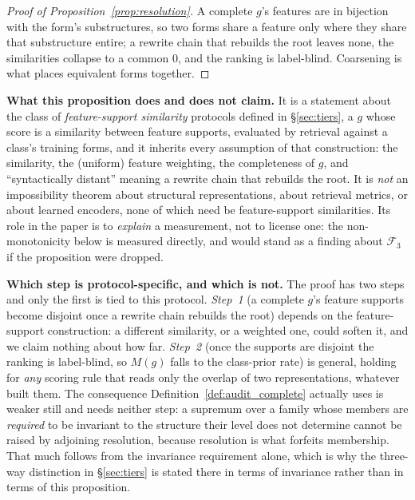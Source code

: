 \begin{proof}[Proof of Proposition~\ref{prop:resolution}]
A complete $g$'s features are in bijection with the form's substructures, so two forms share a feature only where they share that substructure entire; a rewrite chain that rebuilds the root leaves none, the similarities collapse to a common $0$, and the ranking is label-blind. Coarsening is what places equivalent forms together.
\end{proof}

\noindent \textbf{What this proposition does and does not claim.} It is a statement about the class of \emph{feature-support similarity} protocols defined in \S\ref{sec:tiers}, a $g$ whose score is a similarity between feature supports, evaluated by retrieval against a class's training forms, and it inherits every assumption of that construction: the similarity, the (uniform) feature weighting, the completeness of $g$, and ``syntactically distant'' meaning a rewrite chain that rebuilds the root. It is \emph{not} an impossibility theorem about structural representations, about retrieval metrics, or about learned encoders, none of which need be feature-support similarities. Its role in the paper is to \emph{explain} a measurement, not to license one: the non-monotonicity below is measured directly, and would stand as a finding about $\mathcal{F}_3$ if the proposition were dropped.

\noindent \textbf{Which step is protocol-specific, and which is not.} The proof has two steps and only the first is tied to this protocol. \emph{Step~1} (a complete $g$'s feature supports become disjoint once a rewrite chain rebuilds the root) depends on the feature-support construction: a different similarity, or a weighted one, could soften it, and we claim nothing about how far. \emph{Step~2} (once the supports are disjoint the ranking is label-blind, so $M(g)$ falls to the class-prior rate) is general, holding for \emph{any} scoring rule that reads only the overlap of two representations, whatever built them. The consequence Definition~\ref{def:audit_complete} actually uses is weaker still and needs neither step: a supremum over a family whose members are \emph{required} to be invariant to the structure their level does not determine cannot be raised by adjoining resolution, because resolution is what forfeits membership. That much follows from the invariance requirement alone, which is why the three-way distinction in \S\ref{sec:tiers} is stated there in terms of invariance rather than in terms of this proposition.

